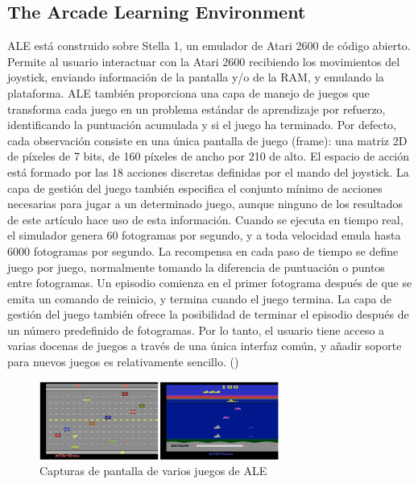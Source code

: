 \subsection{The Arcade Learning Environment}\label{section:state-of-the-art:evaluation-enviroments-for-generalization-on-rl-algoritms:ALE}

ALE está construido sobre Stella 1, un emulador de Atari 2600 de código abierto. Permite al usuario interactuar con la Atari 2600 recibiendo los movimientos del joystick, enviando información de la pantalla y/o de la RAM, y emulando la plataforma. ALE también proporciona una capa de manejo de juegos que transforma cada juego en un problema estándar de aprendizaje por refuerzo, identificando la puntuación acumulada y si el juego ha terminado. Por defecto, cada observación consiste en una única pantalla de juego (frame): una matriz 2D de píxeles de 7 bits, de 160 píxeles de ancho por 210 de alto. El espacio de acción está formado por las 18 acciones discretas definidas por el mando del joystick. La capa de gestión del juego también especifica el conjunto mínimo de acciones necesarias para jugar a un determinado juego, aunque ninguno de los resultados de este artículo hace uso de esta información. Cuando se ejecuta en tiempo real, el simulador genera 60 fotogramas por segundo, y a toda velocidad emula hasta 6000 fotogramas por segundo. La recompensa en cada paso de tiempo se define juego por juego, normalmente tomando la diferencia de puntuación o puntos entre fotogramas. Un episodio comienza en el primer fotograma después de que se emita un comando de reinicio, y termina cuando el juego termina. La capa de gestión del juego también ofrece la posibilidad de terminar el episodio después de un número predefinido de fotogramas. Por lo tanto, el usuario tiene acceso a varias docenas de juegos a través de una única interfaz común, y añadir soporte para nuevos juegos es relativamente sencillo. (\cite{bellemare2013arcade})

\begin{figure}[ht!]
    \centering
    \includegraphics[width=0.7\textwidth]{Graphics/ale.png}
    \caption{Capturas de pantalla de varios juegos de ALE}
    \label{fig:ale}
\end{figure}

